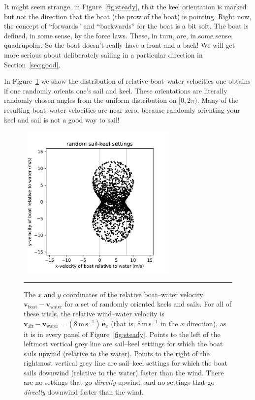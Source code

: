 \documentclass[letterpaper]{article}
\renewcommand{\vec}[1]{\boldsymbol{#1}}
\newcommand{\uvec}{\vec{\hat{e}}}
\newcommand{\air}{\text{air}}
\newcommand{\water}{\text{water}}
\newcommand{\boat}{\text{boat}}
\newcommand{\vair}{\vec{v}_\air}
\newcommand{\vwater}{\vec{v}_\water}
\newcommand{\vboat}{\vec{v}_\boat}
\newcommand{\mps}{\mathrm{m\,s^{-1}}}
\newcommand{\secref}[1]{Section~\ref{#1}}
\newcommand{\figref}[1]{Figure~\ref{#1}}
\newcommand{\figurerule}{\rule[1ex]{\textwidth}{0.2pt}}
\begin{document}
It might seem strange, in \figref{fig:steady}, that the keel orientation is marked but not the direction that the boat (the prow of the boat) is pointing.
Right now, the concept of ``forwards'' and ``backwards'' for the boat is a bit soft.
The boat is defined, in some sense, by the force laws.
These, in turn, are, in some sense, quadrupolar.
So the boat doesn't really have a front and a back!
We will get more serious about deliberately sailing in a particular direction in \secref{sec:good}.

In \figref{fig:hourglass} we show the distribution of relative boat--water velocities one obtains if one randomly orients one's sail and keel.
These orientations are literally randomly chosen angles from the uniform distribution on $[0,2\pi)$.
Many of the resulting boat--water velocities are near zero, because randomly orienting your keel and sail is not a good way to sail!
\begin{figure}[t!]
  ~\hfill\includegraphics[width=3in]{hourglass-random.pdf}\hfill~
  \caption{The $x$ and $y$ coordinates of the relative boat--water velocity $\vboat-\vwater$ for a set of randomly oriented keels and sails.
  For all of these trials, the relative wind--water velocity is $\vair-\vwater=(8\,\mps)\,\uvec_x$ (that is, $8\,\mps$ in the $x$ direction), as it is in every panel of \figref{fig:steady}.
  Points to the left of the leftmost vertical grey line are sail--keel settings for which the boat sails upwind (relative to the water). Points to the right of the rightmost vertical grey line are sail--keel settings for which the boat sails downwind (relative to the water) faster than the wind.
  There are no settings that go \emph{directly} upwind, and no settings that go \emph{directly} downwind faster than the wind.\label{fig:hourglass}}
  \figurerule
\end{figure}
\end{document}
